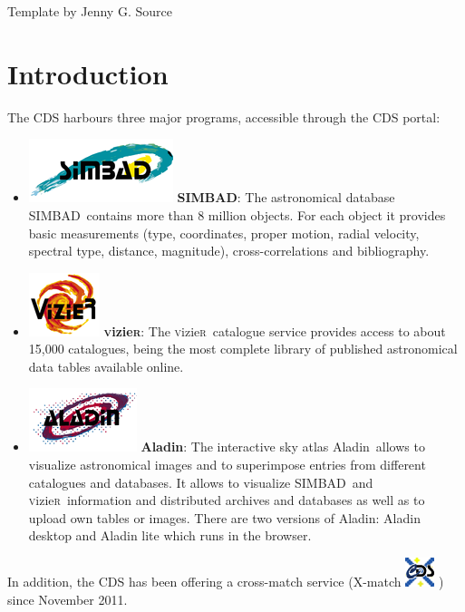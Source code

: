 \documentclass [a4paper, 12pt]{article}
\newcommand{\aladin}{{\textsc{A}{ladin}}}
\newcommand{\simbad}{{\textsc{SIMBAD}}}
\newcommand{\vizier}{{\textsc{v}izie\textsc{r}}}
\begin{document}
\vspace{3.5cm}
Template by Jenny G. Source


\newpage
\normalsize
\vfill
\tableofcontents
\vfill

\newpage

\justify
\section{Introduction}

The CDS harbours three major programs, accessible through the CDS portal:\\
\begin{itemize}
\item \includegraphics[width=0.1 \textwidth]{../images/logo_simbad.png} 
\textbf{\simbad}: The astronomical database \simbad\ contains more than 
8 million objects. For each object it provides basic measurements (type, 
coordinates, proper motion, radial velocity, spectral type, distance, 
magnitude), cross-correlations and bibliography.
\item \includegraphics[width=0.08  \textwidth]{../images/logo_vizier.png}  
\textbf{\vizier}: The \vizier\ catalogue service provides access to about 
15,000 catalogues, being the most complete library of published astronomical 
data tables available online.
\item \includegraphics[width=0.1  \textwidth]{../images/logo_aladin.png} 
\textbf{\aladin}: The interactive sky atlas \aladin\ allows to 
visualize astronomical images and to superimpose entries from different 
catalogues and databases. It allows to visualize \simbad\ and \vizier\ 
information and distributed archives and databases as well as to upload own 
tables or images. There are two versions of \aladin: Aladin desktop and Aladin 
lite which runs in the browser.
\end{itemize}

In addition, the CDS has been offering a cross-match service 
(X-match \includegraphics[width=0.03 
\textwidth]{../images/logo_cds_xmatch.png} ) since November 2011. 
\end{document}
